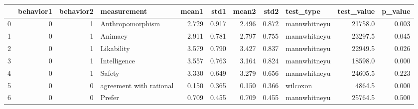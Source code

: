 \begin{tabular}{lrrlrrrrlrr}
\toprule
{} &  behavior1 &  behavior2 &              measurement &  mean1 &   std1 &  mean2 &   std2 &     test\_type &  test\_value &  p\_value \\
\midrule
0 &          0 &          1 &         Anthropomorphism &  2.729 &  0.917 &  2.496 &  0.872 &  mannwhitneyu &     21758.0 &    0.003 \\
1 &          0 &          1 &                  Animacy &  2.911 &  0.781 &  2.797 &  0.755 &  mannwhitneyu &     23297.5 &    0.045 \\
2 &          0 &          1 &               Likability &  3.579 &  0.790 &  3.427 &  0.837 &  mannwhitneyu &     22949.5 &    0.026 \\
3 &          0 &          1 &             Intelligence &  3.557 &  0.763 &  3.164 &  0.824 &  mannwhitneyu &     18598.0 &    0.000 \\
4 &          0 &          1 &                   Safety &  3.330 &  0.649 &  3.279 &  0.656 &  mannwhitneyu &     24605.5 &    0.223 \\
5 &          0 &          0 &  agreement with rational &  0.150 &  0.365 &  0.150 &  0.366 &      wilcoxon &      4864.5 &    0.000 \\
6 &          0 &          0 &                   Prefer &  0.709 &  0.455 &  0.709 &  0.455 &  mannwhitneyu &     25764.5 &    0.500 \\
\bottomrule
\end{tabular}
